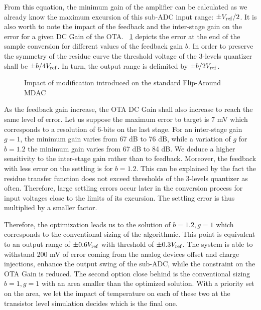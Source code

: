 From this equation, the minimum gain of the amplifier can be calculated as we already know the maximum excursion of this sub-ADC input range: \(\pm V_{\rm ref}/2\). It is also worth to note the impact of the feedback and the inter-stage gain on the error for a given DC Gain of the OTA\@. \figurename~\ref{fig:algo-cb-impact} depicts the error at the end of the sample conversion for different values of the feedback gain \(b\). In order to preserve the symmetry of the residue curve the threshold voltage of the 3-levels quantizer shall be \(\pm b/4 V_{\rm ref}\). In turn, the output range is delimited by \(\pm b/2 V_{\rm ref}\). 

\begin{figure}[htp]
	\centering
	\begin{subfigure}[b]{0.45\textwidth}
		\centering
		\resizebox{\textwidth}{!}{
			
		}
		\label{fig:algo-cb-impact}
	\end{subfigure}
	\begin{subfigure}[b]{0.45\textwidth}
		\centering
		\resizebox{\textwidth}{!}{
			
		}
		\label{fig:algo-cg-impact}
	\end{subfigure}
	\caption{Impact of modification introduced on the standard Flip-Around MDAC}
	\label{fig:algo-error-cb-cg}
\end{figure}

As the feedback gain increase, the OTA DC Gain shall also increase to reach the same level of error. Let us suppose the maximum error to target is 7 mV which corresponds to a resolution of 6-bits on the last stage. For an inter-stage gain \(g = 1\), the minimum gain varies from 67 dB to 76 dB, while a variation of \(g\) for \(b = 1.2\) the minimum gain varies from 67 dB to 84 dB. We deduce a higher sensitivity to the inter-stage gain rather than to feedback. Moreover, the feedback with less error on the settling is for \(b = 1.2\). This can be explained by the fact the residue transfer function does not exceed thresholds of the 3-levels quantizer as often. Therefore, large settling errors occur later in the conversion process for input voltages close to the limits of its excursion. The settling error is thus multiplied by a smaller factor.

Therefore, the optimization leads us to the solution of \(b = 1.2, g = 1\) which corresponds to the conventional sizing of the algorithmic. This point is equivalent to an output range of \(\pm 0.6 V_{\rm ref}\) with threshold of \(\pm 0.3 V_{\rm ref}\). The system is able to withstand 200 mV of error coming from the analog devices offset and charge injections, enhance the output swing of the sub-ADC, while the constraint on the OTA Gain is reduced. The second option close behind is the conventional sizing \(b = 1, g = 1\) with an area smaller than the optimized solution. With a priority set on the area, we let the impact of temperature on each of these two at the transistor level simulation decides which is the final one.

